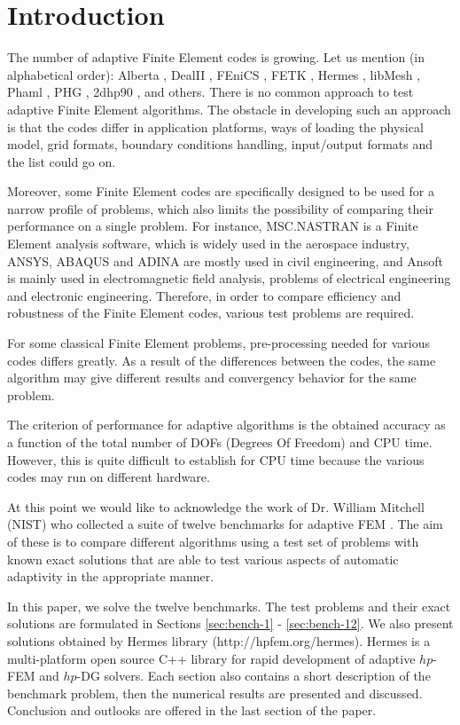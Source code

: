 \section{Introduction}
\label{sec:intro}

The number of adaptive Finite Element codes is growing.
Let us mention (in alphabetical order): Alberta
\cite{alberta}, DealII \cite{dealii}, FEniCS
\cite{fenics}, FETK \cite{fetk}, Hermes \cite{hermes},
libMesh \cite{libmesh}, Phaml \cite{phaml}, PHG \cite{phg},
2dhp90 \cite{2dhp90}, and others.
There is no common approach to test adaptive
Finite Element algorithms. The obstacle in developing such an approach is that 
the codes differ in application platforms, ways of loading the physical model, 
grid formats, boundary conditions handling, input/output formats and the list could go on.

Moreover, some Finite Element codes are specifically designed to be used for 
a narrow profile of problems, which also limits the possibility of comparing 
their performance on a single problem.
For instance, MSC.NASTRAN is a Finite Element analysis software,
which is widely used in the aerospace industry, ANSYS, ABAQUS and ADINA are
mostly used in civil engineering, and Ansoft is mainly used in electromagnetic
field analysis, problems of electrical engineering and electronic engineering.
Therefore, in order to compare efficiency and robustness of the Finite Element 
codes, various test problems are required.

For some classical Finite Element problems, pre-processing 
needed for various codes differs greatly. 
As a result of the differences between the codes, 
the same algorithm may give different results and convergency 
behavior for the same problem.

The criterion of performance for adaptive algorithms 
is the obtained accuracy as a function of the total number
of DOFs (Degrees Of Freedom) and CPU time. However, 
this is quite difficult to establish for CPU time because 
the various codes may run on different hardware.

At this point we would like to acknowledge the work of
Dr. William Mitchell (NIST) who collected a suite of
twelve benchmarks for adaptive FEM \cite{mitchell-1}. 
The aim of these is to compare different algorithms 
using a test set of problems with known exact solutions 
that are able to test various aspects of automatic 
adaptivity in the appropriate manner.

In this paper, we solve the twelve benchmarks. 
The test problems and their exact solutions are 
formulated in Sections \ref{sec:bench-1} - \ref{sec:bench-12}. 
We also present solutions obtained by {\sc Hermes} library (http://hpfem.org/hermes). 
{\sc Hermes} is a multi-platform open source C++ 
library for rapid development of adaptive $hp$-FEM
and $hp$-DG solvers. Each section also contains a short 
description of the benchmark problem, then the numerical 
results are presented and discussed. Conclusion and outlooks 
are offered in the last section of the paper.


